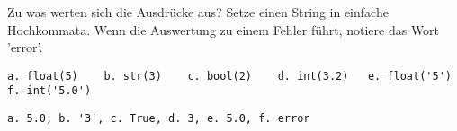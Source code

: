 \question[3]
Zu was werten sich die Ausdrücke aus? Setze einen String in einfache Hochkommata.
Wenn die Auswertung zu einem Fehler führt, notiere das
Wort 'error'.

\begin{lstlisting}
a. float(5)    b. str(3)    c. bool(2)    d. int(3.2)   e. float('5')    f. int('5.0')
\end{lstlisting}
\begin{solutionbox}{2cm}
\begin{lstlisting}
a. 5.0, b. '3', c. True, d. 3, e. 5.0, f. error
\end{lstlisting}
\end{solutionbox}
